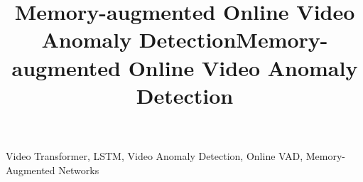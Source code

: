 \documentclass{article}
\title{Memory-augmented Online Video Anomaly Detection}
\begin{document}
%
\maketitle
%
    \title{Memory-augmented Online Video Anomaly Detection}
    \maketitle
    
    \begin{abstract}
        
    \end{abstract}
    \begin{keywords}
        Video Transformer, LSTM, Video Anomaly Detection, Online VAD, Memory-Augmented Networks
    \end{keywords}
    
    
    
    
    
    
    
\end{document}
